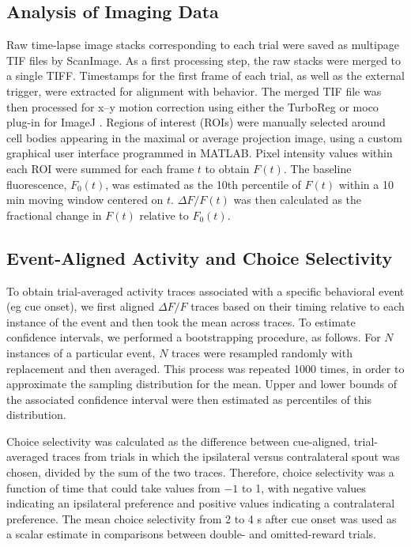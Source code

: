 \subsection*{Analysis of Imaging Data}
Raw time-lapse image stacks corresponding to each trial were saved as multipage TIF files by ScanImage. As a first processing step, the raw stacks were merged to a single TIFF. Timestamps for the first frame of each trial, as well as the external trigger, were extracted for alignment with behavior. The merged TIF file was then processed for x–y motion correction using either the TurboReg \citep{thevenaz1998pyramid} or moco \citep{dubbs2016moco} plug-in for ImageJ \citep{schneider2012nih}. Regions of interest (ROIs) were manually selected around cell bodies appearing in the maximal or average projection image, using a custom graphical user interface programmed in MATLAB. Pixel intensity values within each ROI were summed for each frame $t$ to obtain $F(t)$. The baseline fluorescence, $F_0(t)$, was estimated as the 10th percentile of $F(t)$  within a 10 min moving window centered on $t$. $\Delta F/F(t)$ was then calculated as the fractional change in $F(t)$  relative to $F_0(t)$.

\subsection*{Event-Aligned Activity and Choice Selectivity}
To obtain trial-averaged activity traces associated with a specific behavioral event (eg cue onset), we first aligned $\Delta F/F$ traces based on their timing relative to each instance of the event and then took the mean across traces. To estimate confidence intervals, we performed a bootstrapping procedure, as follows. For $N$ instances of a particular event, $N$ traces were resampled randomly with replacement and then averaged. This process was repeated 1000 times, in order to approximate the sampling distribution for the mean. Upper and lower bounds of the associated confidence interval were then estimated as percentiles of this distribution. 

Choice selectivity was calculated as the difference between cue-aligned, trial-averaged traces from trials in which the ipsilateral versus contralateral spout was chosen, divided by the sum of the two traces. Therefore, choice selectivity was a function of time that could take values from $-1$ to 1, with negative values indicating an ipsilateral preference and positive values indicating a contralateral preference. The mean choice selectivity from 2 to 4 s after cue onset was used as a scalar estimate in comparisons between double- and omitted-reward trials.


